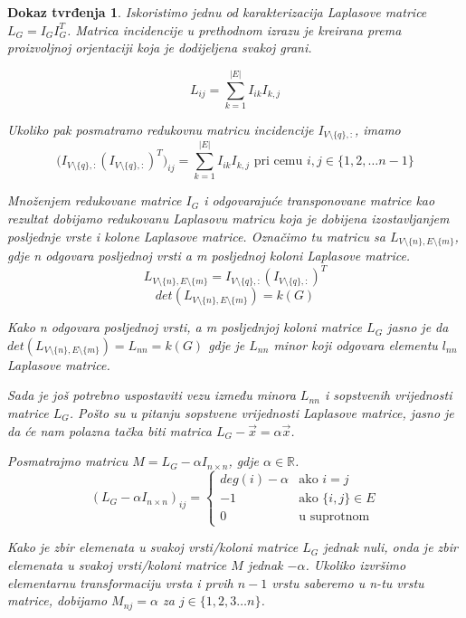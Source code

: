 \documentclass[11pt]{article}
\newtheorem*{custom_proof}{Dokaz tvrđenja}
\begin{document}
\begin{custom_proof}
		Iskoristimo jednu od karakterizacija Laplasove matrice $L_G = I_G I_G^T$.
		Matrica incidencije u prethodnom izrazu je kreirana prema proizvoljnoj orjentaciji koja je dodijeljena svakoj grani.
		
		\[
			L_{ij} = \sum_{k=1}^{|E|} I_{ik}I_{k,j}
		\]

		Ukoliko pak posmatramo redukovnu matricu incidencije $I_{V \setminus \{q\},:}$, imamo
		\[
		\big(I_{V \setminus \{q\},:}(I_{V \setminus \{q\},:})^T\big)_{ij} = \sum_{k=1}^{|E|} I_{ik}I_{k,j} \text{ pri cemu } i,j \in \{1,2, \dots n-1\}
		\]
	
		Množenjem redukovane matrice $I_G$ i odgovarajuće transponovane matrice kao rezultat dobijamo redukovanu Laplasovu matricu koja je dobijena izostavljanjem posljednje vrste i kolone Laplasove matrice.
		Označimo tu matricu sa $L_{V \setminus \{n\}, E \setminus \{m\}}$, gdje n odgovara posljednoj vrsti a m posljednoj koloni Laplasove matrice.
		\[
			L_{V \setminus \{n\}, E \setminus \{m\}} = I_{V \setminus \{q\},:}(I_{V \setminus \{q\},:})^T
		\]
		\[
			det(L_{V \setminus \{n\}, E \setminus \{m\}}) = k(G)
		\]

		Kako n odgovara posljednoj vrsti, a m posljednjoj koloni matrice $L_G$ jasno je da $det(L_{V \setminus \{n\}, E \setminus \{m\}}) = L_{nn} = k(G)$ gdje je $L_{nn}$ minor koji odgovara elementu $l_{nn}$ Laplasove matrice.
	
	 	Sada je još potrebno uspostaviti vezu između minora $L_{nn}$ i sopstvenih vrijednosti matrice $L_G$.
		Pošto su u pitanju sopstvene vrijednosti Laplasove matrice, jasno je da će nam polazna tačka biti matrica $L_G-\vec{x} = \alpha \vec{x} $.
	
		Posmatrajmo matricu $ M = L_G - \alpha I_{n \times n}$, gdje $\alpha \in \mathbb{R}$.
		\[
				 (L_G - \alpha I_{n \times n})_{ij} =
				 \begin{cases}
				 deg(i) - \alpha  & \text{ako } i = j \\
				 -1 & \text{ako } \{i,j\} \in E \\ 
				 0  & \text{u suprotnom}
				 \end{cases}
		\]

		Kako je zbir elemenata u svakoj vrsti/koloni matrice $L_G$ jednak nuli, onda je zbir elemenata u svakoj vrsti/koloni matrice $M$ jednak $-\alpha$.
		Ukoliko izvršimo elementarnu transformaciju vrsta i prvih $n-1$ vrstu saberemo u n-tu vrstu matrice, dobijamo  $M_{nj} = \alpha$ za $ j \in \{1,2,3 \dots n\}$.
		

\end{custom_proof}
\end{document}
